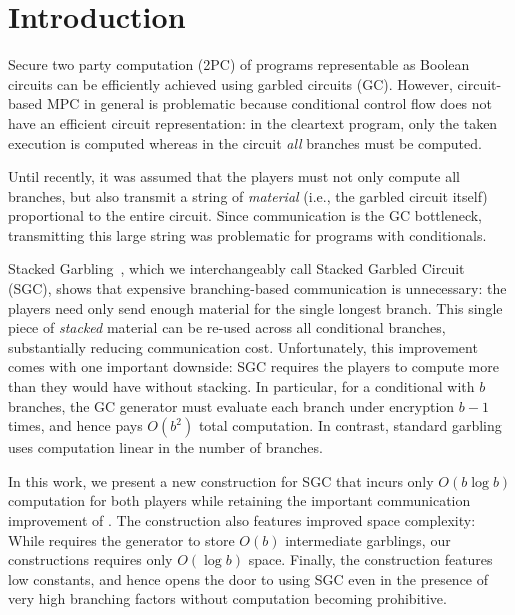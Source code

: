 \section{Introduction}\label{sec:intro}

Secure two party computation (2PC) of programs representable as Boolean circuits can be efficiently achieved using garbled circuits (GC).
%
However,  circuit-based MPC in general is problematic because conditional
control flow does not have an efficient circuit representation:
in the cleartext program, only the taken execution is computed whereas in
the circuit \emph{all} branches must be computed.

%
Until recently, it was assumed that the players must not only compute
all branches, but also transmit a string of \emph{material} (i.e., the garbled circuit itself) 
proportional to the entire circuit.  
Since communication is the GC bottleneck, transmitting this large string was
problematic for programs with conditionals.

Stacked Garbling~\HK, which we %
interchangeably call Stacked Garbled Circuit (SGC), shows that
expensive branching-based communication is unnecessary: the players need only
send enough material for the single longest branch. This single
piece of \emph{stacked} material can be re-used across all conditional branches,
substantially reducing communication cost.
%
Unfortunately, this improvement comes with one important downside:
SGC requires the players to compute more than they would have without stacking.
In particular, for a conditional with $b$ branches, the \HK GC
generator must evaluate each branch under encryption $b-1$ times, and
hence pays $O(b^2)$ total computation.
In contrast, standard garbling uses computation linear in the number
of branches.

In this work, we present a new construction for SGC that incurs
only $O(b \log b)$ computation for both players while
retaining the important communication improvement of \HK.
%
The construction also features improved space complexity: While \HK
requires the generator to store $O(b)$ intermediate garblings, our
constructions requires only $O(\log b)$ space.
%
Finally, the construction features low constants, and hence opens the
door to using SGC even in the presence of very high branching factors
without computation becoming prohibitive.


